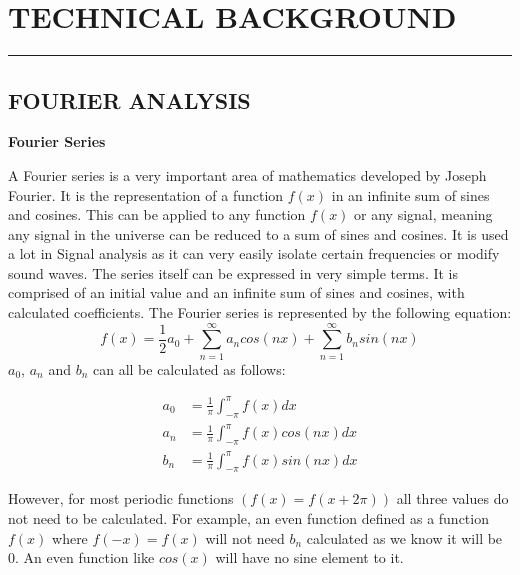\documentclass[12pt,a4paper]{article}
\begin{document}
\Large
\section{TECHNICAL BACKGROUND}
\vspace{-5mm}
\rule{\linewidth}{0.1mm}
\large
		\subsection{FOURIER ANALYSIS}
			\normalsize
				\textbf{Fourier Series}

			A Fourier series is a very important area of mathematics developed by Joseph Fourier. It is the representation of a function $f(x)$ in an infinite sum of sines and cosines.
			This can be applied to any function $f(x)$ or any signal, meaning any signal in the universe can be reduced to a sum of sines and cosines. It is used a lot in Signal analysis as it can very easily
			isolate certain frequencies or modify sound waves. The series itself can be expressed in very simple terms. It is comprised of an initial value and an infinite sum of sines and cosines,
			with calculated coefficients. The Fourier series is represented by the following equation:\cite{equation}
$$
				f(x) = \frac{1}{2} a_0 + \sum^{\infty}_{n=1} a_n cos(nx) + \sum^{\infty}_{n=1} b_n sin(nx)
$$
			$a_0$, $a_n$ and $b_n$ can all be calculated as follows:

\begin{align*}
    a_0 &= \frac{1}{\pi} \int^{\pi}_{-\pi} f(x) dx\\
    a_n &= \frac{1}{\pi} \int^{\pi}_{-\pi} f(x)cos(nx) dx\\
    b_n &= \frac{1}{\pi} \int^{\pi}_{-\pi} f(x)sin(nx) dx
\end{align*}

However, for most periodic functions $(f(x) = f(x+2\pi))$ all three values do not need to be calculated. For example, an even function defined as a function $f(x)$ where $f(-x) = f(x)$ will
not need $b_n$ calculated as we know it will be 0. An even function like $cos(x)$ will have no 
sine element to it.
\end{document}
